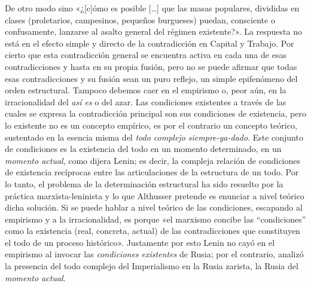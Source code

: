 De otro modo sino «¿{[}c{]}ómo es posible {[}\ldots{]} que las masas populares, divididas en clases (proletarios, campesinos, pequeños burgueses) puedan, consciente o confusamente, lanzarse al asalto general del régimen existente?». La respuesta no está en el efecto simple y directo de la contradicción en Capital y Trabajo. Por cierto que esta contradicción general se encuentra activa en cada una de esas contradicciones y hasta en su propia fusión, pero no se puede afirmar que todas esas contradicciones y su fusión sean un puro reflejo, un simple epifenómeno del orden estructural. Tampoco debemos caer en el empirismo o, peor aún, en la irracionalidad del \emph{así es} o del azar. Las condiciones existentes a través de las cuales se expresa la contradicción principal son sus condiciones de existencia, pero lo existente no es un concepto empírico, es por el contrario un concepto teórico, sustentado en la esencia misma del \emph{todo complejo siempre-ya-dado}. Este conjunto de condiciones es la existencia del todo en un momento determinado, en un \emph{momento actual}, como dijera Lenin; es decir, la compleja relación de condiciones de existencia recíprocas entre las articulaciones de la estructura de un todo. Por lo tanto, el problema de la determinación estructural ha sido resuelto por la práctica marxista-leninista y lo que Althusser pretende es enunciar a nivel teórico dicha solución. Si se puede hablar a nivel teórico de las condiciones, escapando al empirismo y a la irracionalidad, es porque «el marxismo concibe las ``condiciones'' como la existencia (real, concreta, actual) de las contradicciones que constituyen el todo de un proceso histórico». Justamente por esto Lenin no cayó en el empirismo al invocar las \emph{condiciones existentes} de Rusia; por el contrario, analizó la presencia del todo complejo del Imperialismo en la Rusia zarista, la Rusia del \emph{momento actual}.

